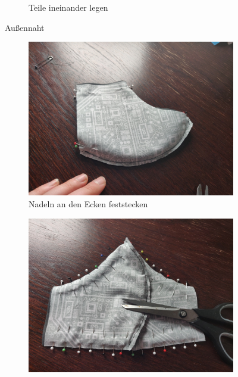 \documentclass[12pt,parskip=full]{scrartcl}
\begin{document}
\begin{figure}[hb]
\begin{subfigure}{0.48\textwidth}
        \caption{Teile ineinander legen}
        \label{OuterSeam2}
    \end{subfigure}
    \caption{Außennaht}
    \label{OuterSeamFirst}
\end{figure}

\begin{figure}[ht]
    \vspace{0.5cm}
    \centering
    \begin{subfigure}{0.48\textwidth}
        \centering
        \includegraphics[width = \linewidth]{Pictures/05_OuterSeam/OuterSeam3_resized.jpg}
        \caption{Nadeln an den Ecken feststecken}
        \label{OuterSeam3}
    \end{subfigure}
    \begin{subfigure}{0.48\textwidth}
        \centering
        \includegraphics[width = \linewidth]{Pictures/05_OuterSeam/OuterSeam4_resized.jpg}

\end{subfigure}
\end{figure}
\end{document}
